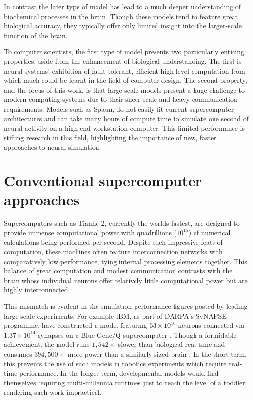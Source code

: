 		
		In contrast the later type of model has lead to a much deeper understanding
		of biochemical processes in the brain. Though these models tend to feature
		great biological accuracy, they typically offer only limited insight into
		the larger-scale function of the brain.
		
		To computer scientists, the first type of model presents two particularly
		enticing properties, aside from the enhancement of biological understanding.
		The first is neural systems' exhibition of fault-tolerant, efficient
		high-level computation from which much could be learnt in the field of
		computer design. The second property, and the focus of this work, is that
		large-scale models present a huge challenge to modern computing systems due
		to their sheer scale and heavy communication requirements. Models such as
		Spaun, do not easily fit current supercomputer architectures and can take
		many hours of compute time to simulate one second of neural activity on a
		high-end workstation computer. This limited performance is stifling research
		in this field, highlighting the importance of new, faster approaches to
		neural simulation.
	
	\section{Conventional supercomputer approaches}
	
		Supercomputers such as Tianhe-2, currently the worlds
		fastest\cite{meuer13n}, are designed to provide immense computational power
		with quadrillions ($10^{15}$) of numerical calculations being performed per
		second. Despite such impressive feats of computation, these machines often
		feature interconnection networks with comparatively low performance, tying
		internal processing elements together. This balance of great computation and
		modest communication contrasts with the brain whose individual neurons offer
		relatively little computational power but are highly interconnected.
		
		This mismatch is evident in the simulation performance figures posted by
		leading large scale experiments. For example IBM, as part of DARPA's SyNAPSE
		programme, have constructed a model featuring $53 \times 10^{10}$ neurons
		connected via $1.37 \times 10^{14}$ synapses on a Blue Gene/Q supercomputer
		\cite{ibm13}. Though a formidable achievement, the model runs $1,542\times$
		slower than biological real-time and consumes $394,500\times$ more power
		than a similarly sized brain \cite{drubach00}. In the short term, this
		prevents the use of such models in robotics experiments which require
		real-time performance. In the longer term, developmental models would find
		themselves requiring multi-millennia runtimes just to reach the level of a
		toddler rendering such work impractical.
		

